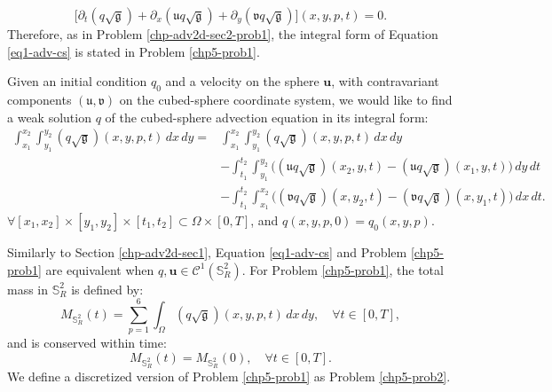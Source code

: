 \begin{equation}
	\label{eq2-adv-cs}
	\bigg[{\partial}_t{(q \sqrt{\mathfrak{g}})}+
	{\partial}_x{(\mathfrak{u}q \sqrt{\mathfrak{g}})}+
	{\partial}_y{(\mathfrak{v}q \sqrt{\mathfrak{g}})}
	\bigg](x,y,p,t)
	= 0.
\end{equation}
Therefore, as in Problem \eqref{chp-adv2d-sec2-prob1}, the integral form of Equation \eqref{eq1-adv-cs}
is stated in Problem \eqref{chp5-prob1}.
\begin{prob}
	\label{chp5-prob1}
	Given an initial condition ${q}_0$ and
	a velocity on the sphere $\boldsymbol{u}$, with contravariant components $(\mathfrak{u},\mathfrak{v})$ on the cubed-sphere coordinate system,
	we would like to find a weak solution ${q}$
	of the cubed-sphere advection equation in its integral form:
	\begin{align*}
		\int_{x_1}^{x_2} \int_{y_1}^{y_2}
		{(q\sqrt{\mathfrak{g}})}(x, y, p, t) \,dx \,dy = &\int_{x_1}^{x_2} \int_{y_1}^{y_2}
		{(q\sqrt{\mathfrak{g}})}(x, y, p, t) \,dx \,dy \\ \nonumber
		&-\int_{t_1}^{t_2} \int_{y_1}^{y_2} \bigg({(\mathfrak{u}q\sqrt{\mathfrak{g}})}(x_2, y, t)
		-{(\mathfrak{u}q\sqrt{\mathfrak{g}})}(x_1, y, t) \bigg) \,dy \,dt\\ \nonumber
		&-\int_{t_1}^{t_2} \int_{x_1}^{x_2} \bigg({(\mathfrak{v}q\sqrt{\mathfrak{g}})}(x, y_2, t)
		-{(\mathfrak{v}q\sqrt{\mathfrak{g}})}(x, y_1, t) \bigg) \,dx \,dt.
	\end{align*}
	$\forall [x_1, x_2]\times [y_1, y_2] \times[t_1, t_2] \subset \Omega \times[0,T]$, and
	$q(x,y,p,0)=q_0(x,y,p)$.
\end{prob}
Similarly to Section \ref{chp-adv2d-sec1}, Equation \eqref{eq1-adv-cs} and Problem \eqref{chp5-prob1} are equivalent
when ${q}, \boldsymbol{u} \in \mathcal{C}^1(\mathbb{S}^2_R)$.
For Problem \ref{chp5-prob1}, the total mass in $\mathbb{S}^2_R$ is defined by: 
\begin{equation}
	{M}_{\mathbb{S}^2_R}(t) = \sum_{p=1}^6 \int_{\Omega} {(q\sqrt{\mathfrak{g}})}(x,y,p,t) \,dx \,dy , \quad \forall t \in [0,T],
\end{equation}
and is conserved within time: 
\begin{equation}
	{M}_{\mathbb{S}^2_R}(t) = {M}_{\mathbb{S}^2_R}(0), \quad \forall t \in [0,T].
\end{equation}
We define a discretized version of Problem \eqref{chp5-prob1} as Problem \eqref{chp5-prob2}.
